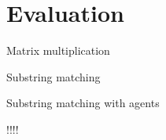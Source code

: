 \section{Evaluation}

Matrix multiplication

Substring matching

Substring matching with agents

!!!!